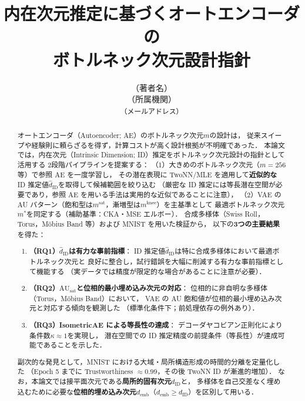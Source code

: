 \documentclass[12pt,a4paper]{jsarticle}
\title{内在次元推定に基づくオートエンコーダの\\
       ボトルネック次元設計指針}
\author{（著者名）\\
{\small （所属機関）}\\
{\small \texttt{（メールアドレス）}}}
\date{}
\begin{document}
\maketitle

\begin{abstract}
オートエンコーダ（Autoencoder; AE）のボトルネック次元$m$の設計は，
従来スイープや経験則に頼らざるを得ず，計算コストが高く設計根拠が不明確であった．
本論文では，内在次元（Intrinsic Dimension; ID）推定をボトルネック次元設計の指針として活用する
2段階パイプラインを提案する：
（1）大きめのボトルネック次元（$m = 256$等）で参照 AE を一度学習し，
その潜在表現に TwoNN/MLE を適用して\textbf{近似的な} ID 推定値$\hat{d}_\mathrm{ID}$を取得して候補範囲を絞り込む
（厳密な ID 推定には等長潜在空間が必要であり，参照 AE を用いる手法は実用的な近似であることに注意），
（2）VAE の AU パターン（飽和型は$m^{\mathrm{sat}}$，漸増型は$m^{\mathrm{knee}}$）を主基準として
最適ボトルネック次元$m^*$を同定する（補助基準：CKA・MSE エルボー）．
合成多様体（Swiss Roll，Torus，Möbius Band 等）および MNIST を用いた検証から，
以下の\textbf{3つの主要結果}を得た：
\begin{enumerate}
  \item \textbf{（RQ1）$\hat{d}_\mathrm{ID}$は有力な事前指標}：
        ID 推定値$\hat{d}_\mathrm{ID}$は特に合成多様体において最適ボトルネック次元と
        良好に整合し，試行錯誤を大幅に削減する有力な事前指標として機能する
        （実データでは精度が限定的な場合があることに注意が必要）．
  \item \textbf{（RQ2）$\mathrm{AU}_\mathrm{sat}$と位相的最小埋め込み次元の対応}：
        位相的に非自明な多様体（Torus，Möbius Band）において，
        VAE の AU 飽和値が位相的最小埋め込み次元と対応する傾向を観測した
        （標準化条件下；前処理依存の例外あり）．
  \item \textbf{（RQ3）IsometricAE による等長性の達成}：
        デコーダヤコビアン正則化により条件数$\kappa \approx 1$を実現し，
        潜在空間での ID 推定精度の前提条件（等長性）が達成可能であることを示した．
\end{enumerate}
副次的な発見として，MNIST における大域・局所構造形成の時間的分離を定量化した
（Epoch 5 までに Trustworthiness $\approx 0.99$，その後 TwoNN ID が漸進的増加）．
なお，本論文では接平面次元である\textbf{局所的固有次元$d_\mathrm{ID}$}と，
多様体を自己交差なく埋め込むために必要な\textbf{位相的埋め込み次元$d_\mathrm{emb}$}（$d_\mathrm{emb} \geq d_\mathrm{ID}$）を区別して用いる．
\end{abstract}
\end{document}
